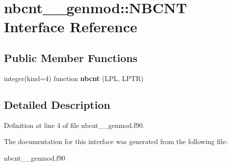 \hypertarget{interfacenbcnt____genmod_1_1_n_b_c_n_t}{\section{nbcnt\+\_\+\+\_\+genmod\+:\+:N\+B\+C\+N\+T Interface Reference}
\label{interfacenbcnt____genmod_1_1_n_b_c_n_t}
}
\subsection*{Public Member Functions}
\begin{DoxyCompactItemize}
\item 
\hypertarget{interfacenbcnt____genmod_1_1_n_b_c_n_t_a31c3527497cfe31e8feb49b09b04b452}{integer(kind=4) function {\bfseries nbcnt} (L\+P\+L, L\+P\+T\+R)}\label{interfacenbcnt____genmod_1_1_n_b_c_n_t_a31c3527497cfe31e8feb49b09b04b452}

\end{DoxyCompactItemize}


\subsection{Detailed Description}


Definition at line 4 of file nbcnt\+\_\+\+\_\+genmod.\+f90.



The documentation for this interface was generated from the following file\+:\begin{DoxyCompactItemize}
\item 
nbcnt\+\_\+\+\_\+genmod.\+f90\end{DoxyCompactItemize}
